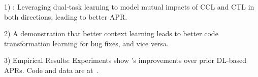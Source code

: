 

1) {\tool}: Leveraging dual-task learning to model mutual impacts of
CCL and CTL in both directions, leading to better APR.


2) A demonstration that better context learning leads to better code
transformation learning for bug fixes, and vice versa.







3) Empirical Results: 
Experiments show {\tool}'s improvements over prior
DL-based APRs. Code and data are at~\cite{CDFix2022}.




